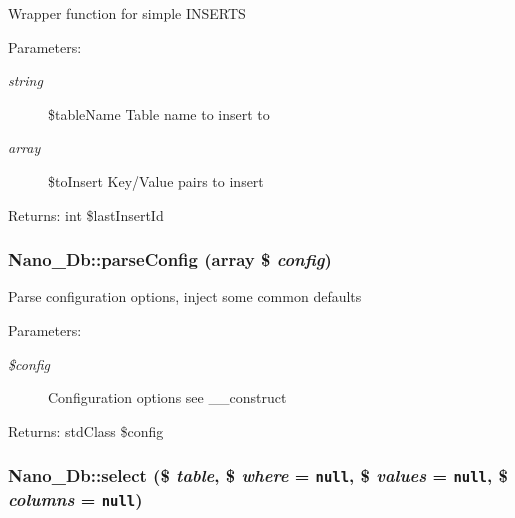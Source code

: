 Wrapper function for simple INSERTS

\begin{Desc}
\item[Parameters:]
\begin{description}
\item[{\em string}]\$tableName Table name to insert to \item[{\em array}]\$toInsert Key/Value pairs to insert\end{description}
\end{Desc}
\begin{Desc}
\item[Returns:]int \$lastInsertId \end{Desc}
\hypertarget{classNano__Db_a6265a626eb00824ebb6c775ffe7a9d8}{
\subsubsection[{parseConfig}]{\setlength{\rightskip}{0pt plus 5cm}Nano\_\-Db::parseConfig (array \$ {\em config})}}
\label{classNano__Db_a6265a626eb00824ebb6c775ffe7a9d8}


Parse configuration options, inject some common defaults

\begin{Desc}
\item[Parameters:]
\begin{description}
\item[{\em \$config}]Configuration options see \_\-\_\-construct \end{description}
\end{Desc}
\begin{Desc}
\item[Returns:]stdClass \$config \end{Desc}
\hypertarget{classNano__Db_4fc2f55d6dc766b1a0ae47160d9de7e8}{
\subsubsection[{select}]{\setlength{\rightskip}{0pt plus 5cm}Nano\_\-Db::select (\$ {\em table}, \/  \$ {\em where} = {\tt null}, \/  \$ {\em values} = {\tt null}, \/  \$ {\em columns} = {\tt null})}}
\label{classNano__Db_4fc2f55d6dc766b1a0ae47160d9de7e8}


